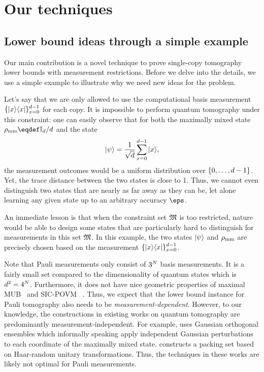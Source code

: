 \section{Our techniques}
\label{sec:techniques}
\subsection{Lower bound ideas through a simple example}
Our main contribution is a novel technique to prove single-copy tomography lower bounds with measurement restrictions. Before we delve into the details, we use a simple example to illustrate why we need new ideas for the problem.

Let's say that we are only allowed to use the computational basis measurement $\{|{x}\rangle\langle{x}|\}_{x=0}^{d-1}$ for each copy. It is impossible to perform quantum tomography under this constraint: one can easily observe that for both the maximally mixed state $\qmm\eqdef\eye_\dims/\dims$ and the state 
\[
|{\psi}\rangle=\frac{1}{\sqrt{d}}\sum_{x=0}^{d-1}|{x}\rangle,
\]
the measurement outcomes would be a uniform distribution over $\{0, \ldots, d-1\}$. Yet, the trace distance between the two states is close to 1. Thus, we cannot even distinguish two states that are nearly as far away as they can be, let alone learning any given state up to an arbitrary accuracy $\eps$.

An immediate lesson is that when the constraint set ${\mathfrak{M}}$ is too restricted, nature would be able to design some states that are particularly hard to distinguish for measurements in this set ${\mathfrak{M}}$. In this example, the two states $|{\psi}\rangle$ and ${\rho_{\text{mm}}}$ are precisely chosen based on the measurement $\{|{x}\rangle\langle{x}|\}_{x=0}^{d-1}$. 

Note that Pauli measurements only consist of $3^{{N}}$ basis measurements. 
It is a fairly small set compared to the dimensionality of quantum states which is $d^2=4^{{N}}$. Furthermore, it does not have nice geometric properties of maximal MUB~\cite{klappenecker2005mutually} and SIC-POVM
~\cite{zauner1999grundzuge}.
Thus, we expect that the lower bound instance for Pauli tomography also needs to be \emph{measurement-dependent}.
However, to our knowledge, the constructions in existing works on quantum tomography are predominantly measurement-independent.
For example, \cite{chen2023does} uses Gaussian orthogonal ensembles which informally speaking apply independent Gaussian perturbations to each coordinate of the maximally mixed state. \cite{HaahHJWY17} constructs a packing set based on Haar-random unitary transformations. 
Thus, the techniques in these works are likely not optimal for Pauli measurements.


